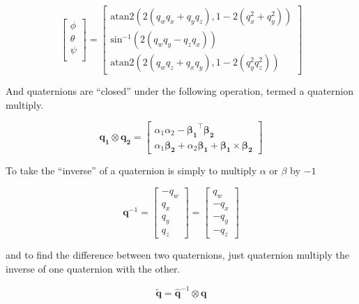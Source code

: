\documentclass[paper=a4, fontsize=11pt]{scrartcl} %
\numberwithin{equation}{section} %
\numberwithin{figure}{section} %
\numberwithin{table}{section} %
\begin{document}
\begin{equation}
	\begin{bmatrix}
		\phi \\
		\theta \\
		\psi \\
	\end{bmatrix}
	=
	\begin{bmatrix}
		\textrm{atan2}\left( 2\left(q_wq_x + q_yq_z\right),1-2\left(q_x^2+q_y^2\right) \right) \\
		\textrm{sin}^{-1}\left( 2 \left( q_wq_y - q_zq_x \right)  \right) \\
		\textrm{atan2}\left( 2 \left( q_wq_z + q_xq_y \right), 1 - 2 \left( q_y^2 q_z^2 \right)  \right) 
	\end{bmatrix}
\end{equation}

And quaternions are ``closed'' under the following operation, termed a quaternion multiply.

\begin{equation}
	\bm{q_1} \otimes \bm{q_2} = \begin{bmatrix}
									\alpha_1\alpha_2 - \bm{\beta_1}^\top\bm{\beta_2} \\
									\alpha_1\bm{\beta_2} + \alpha_2\bm{\beta_1} + \bm{\beta_1} \times \bm{\beta_2}
								\end{bmatrix}
\end{equation}

To take the ``inverse'' of a quaternion is simply to multiply $\alpha$ or $\beta$ by $-1$

\begin{equation}
	\bm{q}^{-1} = \begin{bmatrix}
				-q_w \\
				q_x \\
				q_y \\
				q_z 
			 \end{bmatrix} 
			 	= \begin{bmatrix}
				q_w \\
				-q_x \\
				-q_y \\
				-q_z 
			 \end{bmatrix} 
\end{equation}

and to find the difference between two quaternions, just quaternion multiply the inverse of one quaternion with the other.

\begin{equation}
	\tilde{\bm{q}} = \hat{\bm{q}}^{-1} \otimes \bm{q}
\end{equation}
\end{document}

